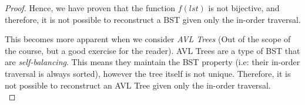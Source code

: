 \documentclass[12pt]{article}
\begin{document}
\begin{proof}
    Hence, we have proven that the function $f(lst)$ is not bijective, and therefore, it is not possible to reconstruct a BST given only the in-order traversal.

    This becomes more apparent when we consider \textit{AVL Trees} (Out of the scope of the course, but a good exercise for the reader). AVL Trees are a type of BST that are \textit{self-balancing}. This means they maintain the BST property (i.e: their in-order traversal is always sorted), however the tree itself is not unique. Therefore, it is not possible to reconstruct an AVL Tree given only the in-order traversal.
    \\
  \end{proof}
\end{document}
